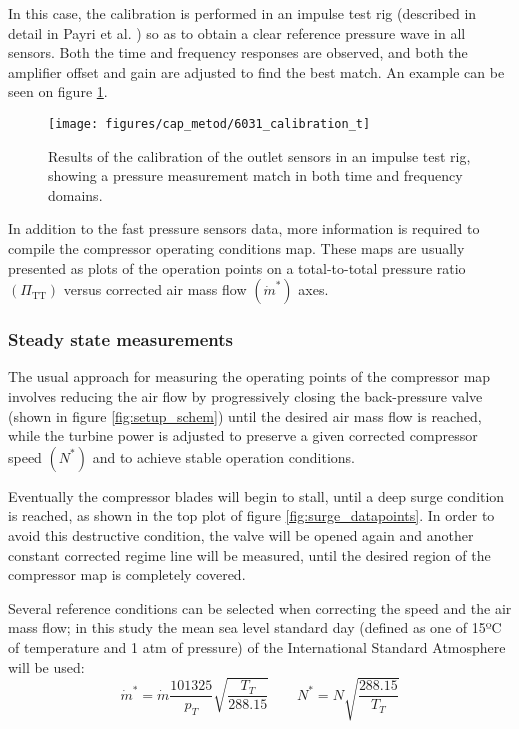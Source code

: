 In this case, the calibration is performed in an impulse test rig (described in detail in Payri et al. \cite{payri2000modified}) so as to obtain a clear reference pressure wave in all sensors. Both the time and frequency responses are observed, and both the amplifier offset and gain are adjusted to find the best match. An example can be seen on figure \ref{fig:6031_calibration}.

\begin{figure}[t!]
\centering
\texttt{[image: figures/cap\_metod/6031\_calibration\_t]}
\caption[Results of the calibration of the outlet sensors]{Results of the calibration of the outlet sensors in an impulse test rig, showing a pressure measurement match in both time and frequency domains.}
\label{fig:6031_calibration}
\end{figure}

In addition to the fast pressure sensors data, more information is required to compile the compressor operating conditions map. These maps are usually presented as plots of the operation points on a total-to-total pressure ratio $(\Pi_\text{TT})$ versus corrected air mass flow $(\dot m^*)$ axes.

\subsubsection{Steady state measurements}
\label{sub:steady_state_measurements}

The usual approach for measuring the operating points of the compressor map involves reducing the air flow by progressively closing the back-pressure valve (shown in figure \ref{fig:setup_schem}) until the desired air mass flow is reached, while the turbine power is adjusted to preserve a given corrected compressor speed $(N^*)$ and to achieve stable operation conditions.

Eventually the compressor blades will begin to stall, until a deep surge condition is reached, as shown in the top plot of figure \ref{fig:surge_datapoints}. In order to avoid this destructive condition, the valve will be opened again and another constant corrected regime line will be measured, until the desired region of the compressor map is completely covered.

Several reference conditions can be selected when correcting the speed and the air mass flow; in this study the mean sea level standard day (defined as one of 15ºC of temperature and 1 atm of pressure) of the International Standard Atmosphere will be used:
\begin{equation}
    \dot m^* = \dot m\frac{101325}{p_{T}}\sqrt{\frac{T_{T}}{288.15}}
    \qquad N^*=N\sqrt{\frac{288.15}{T_{T}}}
\end{equation}

